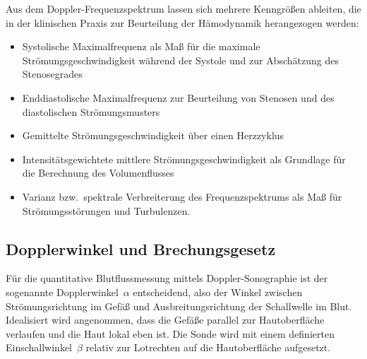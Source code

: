 \documentclass[
	german,%
	accentcolor=3d,%
	type=intern, %
	marginpar=false,%
]{tudapub}
\begin{document}
      Aus dem Doppler-Frequenzspektrum lassen sich mehrere Kenngrößen ableiten, die in der klinischen Praxis zur Beurteilung der Hämodynamik herangezogen werden:
      \begin{itemize}
         \item Systolische Maximalfrequenz als Maß für die maximale
               Strömungsgeschwindigkeit während der Systole und zur Abschätzung des
               Stenosegrades
         \item Enddiastolische Maximalfrequenz zur Beurteilung von Stenosen und des
               diastolischen Strömungsmusters
         \item Gemittelte Strömungsgeschwindigkeit über einen Herzzyklus
         \item Intensitätsgewichtete mittlere Strömungsgeschwindigkeit als Grundlage
               für die Berechnung des Volumenflusses
         \item Varianz bzw.\ spektrale Verbreiterung des Frequenzspektrums als Maß
               für Strömungsstörungen und Turbulenzen.
      \end{itemize}


   \subsection{Dopplerwinkel und Brechungsgesetz}\label{subsec:dopplerwinkel}

      Für die quantitative Blutflussmessung mittels Doppler-Sonographie ist der sogenannte Dopplerwinkel~\(\alpha\) entscheidend, also der Winkel zwischen Strömungsrichtung im Gefäß und Ausbreitungsrichtung der Schallwelle im Blut. Idealisiert wird angenommen, dass die Gefäße parallel zur Hautoberfläche verlaufen und die Haut lokal eben ist. Die Sonde wird mit einem definierten Einschallwinkel~\(\beta\) relativ zur Lotrechten auf die Hautoberfläche aufgesetzt.
\end{document}
